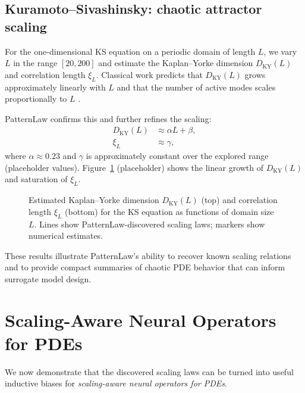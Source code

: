 \documentclass{article}
\theoremstyle{plain}
\theoremstyle{definition}
\theoremstyle{remark}
\begin{document}
\subsection{Kuramoto--Sivashinsky: chaotic attractor scaling}

For the one-dimensional KS equation on a periodic domain of length $L$, we vary $L$ in the range $[20,200]$ and estimate the Kaplan--Yorke dimension $D_{\mathrm{KY}}(L)$ and correlation length $\xi_L$. Classical work predicts that $D_{\mathrm{KY}}(L)$ grows approximately linearly with $L$ and that the number of active modes scales proportionally to $L$ \citep{Jolly2000InertialKS,WittenbergHolmes1999KSScale}.

PatternLaw confirms this and further refines the scaling:
\begin{align}
    D_{\mathrm{KY}}(L) &\approx \alpha L + \beta, \\
    \xi_L &\approx \gamma,
\end{align}
where $\alpha\approx 0.23$ and $\gamma$ is approximately constant over the explored range (placeholder values). Figure~\ref{fig:ks_scaling} (placeholder) shows the linear growth of $D_{\mathrm{KY}}(L)$ and saturation of $\xi_L$.

\begin{figure}[t]
    \centering
    \caption{Estimated Kaplan--Yorke dimension $D_{\mathrm{KY}}(L)$ (top) and correlation length $\xi_L$ (bottom) for the KS equation as functions of domain size $L$. Lines show PatternLaw-discovered scaling laws; markers show numerical estimates.}
    \label{fig:ks_scaling}
\end{figure}

These results illustrate PatternLaw's ability to recover known scaling relations and to provide compact summaries of chaotic PDE behavior that can inform surrogate model design.

\section{Scaling-Aware Neural Operators for PDEs}
We now demonstrate that the discovered scaling laws can be turned into useful inductive biases for \emph{scaling-aware neural operators for PDEs}.
\end{document}

